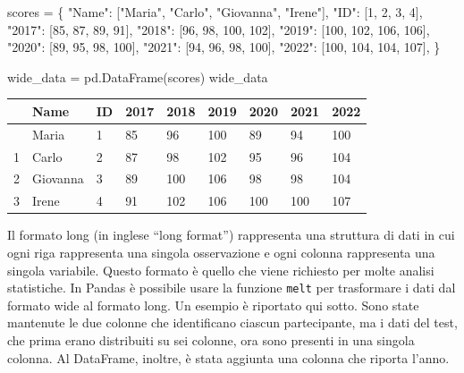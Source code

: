 \documentclass[
  letterpaper,
  krantz2]{{[}./krantz{]}}
\newenvironment{Shaded}{\begin{snugshade}}{\end{snugshade}}
\newcommand{\DecValTok}[1]{\textcolor[rgb]{0.68,0.00,0.00}{#1}}
\newcommand{\NormalTok}[1]{\textcolor[rgb]{0.00,0.23,0.31}{#1}}
\newcommand{\OperatorTok}[1]{\textcolor[rgb]{0.37,0.37,0.37}{#1}}
\newcommand{\StringTok}[1]{\textcolor[rgb]{0.13,0.47,0.30}{#1}}
\begin{document}
\begin{Shaded}
\begin{Highlighting}[]
\NormalTok{scores }\OperatorTok{=}\NormalTok{ \{}
    \StringTok{"Name"}\NormalTok{: [}\StringTok{"Maria"}\NormalTok{, }\StringTok{"Carlo"}\NormalTok{, }\StringTok{"Giovanna"}\NormalTok{, }\StringTok{"Irene"}\NormalTok{],}
    \StringTok{"ID"}\NormalTok{: [}\DecValTok{1}\NormalTok{, }\DecValTok{2}\NormalTok{, }\DecValTok{3}\NormalTok{, }\DecValTok{4}\NormalTok{],}
    \StringTok{"2017"}\NormalTok{: [}\DecValTok{85}\NormalTok{, }\DecValTok{87}\NormalTok{, }\DecValTok{89}\NormalTok{, }\DecValTok{91}\NormalTok{],}
    \StringTok{"2018"}\NormalTok{: [}\DecValTok{96}\NormalTok{, }\DecValTok{98}\NormalTok{, }\DecValTok{100}\NormalTok{, }\DecValTok{102}\NormalTok{],}
    \StringTok{"2019"}\NormalTok{: [}\DecValTok{100}\NormalTok{, }\DecValTok{102}\NormalTok{, }\DecValTok{106}\NormalTok{, }\DecValTok{106}\NormalTok{],}
    \StringTok{"2020"}\NormalTok{: [}\DecValTok{89}\NormalTok{, }\DecValTok{95}\NormalTok{, }\DecValTok{98}\NormalTok{, }\DecValTok{100}\NormalTok{],}
    \StringTok{"2021"}\NormalTok{: [}\DecValTok{94}\NormalTok{, }\DecValTok{96}\NormalTok{, }\DecValTok{98}\NormalTok{, }\DecValTok{100}\NormalTok{],}
    \StringTok{"2022"}\NormalTok{: [}\DecValTok{100}\NormalTok{, }\DecValTok{104}\NormalTok{, }\DecValTok{104}\NormalTok{, }\DecValTok{107}\NormalTok{],}
\NormalTok{\}}

\NormalTok{wide\_data }\OperatorTok{=}\NormalTok{ pd.DataFrame(scores)}
\NormalTok{wide\_data}
\end{Highlighting}
\end{Shaded}

\begin{longtable}[]{@{}lllllllll@{}}
\toprule\noalign{}
& Name & ID & 2017 & 2018 & 2019 & 2020 & 2021 & 2022 \\
\midrule\noalign{}
\endhead
\bottomrule\noalign{}
\endlastfoot
0 & Maria & 1 & 85 & 96 & 100 & 89 & 94 & 100 \\
1 & Carlo & 2 & 87 & 98 & 102 & 95 & 96 & 104 \\
2 & Giovanna & 3 & 89 & 100 & 106 & 98 & 98 & 104 \\
3 & Irene & 4 & 91 & 102 & 106 & 100 & 100 & 107 \\
\end{longtable}

Il formato long (in inglese ``long format'') rappresenta una struttura
di dati in cui ogni riga rappresenta una singola osservazione e ogni
colonna rappresenta una singola variabile. Questo formato è quello che
viene richiesto per molte analisi statistiche. In Pandas è possibile
usare la funzione \texttt{melt} per trasformare i dati dal formato wide
al formato long. Un esempio è riportato qui sotto. Sono state mantenute
le due colonne che identificano ciascun partecipante, ma i dati del
test, che prima erano distribuiti su sei colonne, ora sono presenti in
una singola colonna. Al DataFrame, inoltre, è stata aggiunta una colonna
che riporta l'anno.
\end{document}
